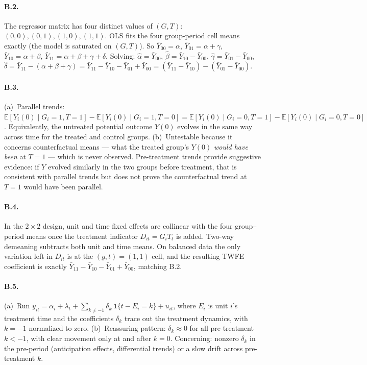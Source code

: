 \documentclass{article}
\newcommand{\E}{\mathbb{E}}
\begin{document}
\paragraph{B.2.}  The regressor matrix has four distinct values of $(G, T)$: $(0,0), (0,1), (1,0), (1,1)$.  OLS fits the four group-period cell means exactly (the model is saturated on $(G, T)$).  So $\bar Y_{00} = \alpha$, $\bar Y_{01} = \alpha + \gamma$, $\bar Y_{10} = \alpha + \beta$, $\bar Y_{11} = \alpha + \beta + \gamma + \delta$.  Solving: $\hat\alpha = \bar Y_{00}$, $\hat\beta = \bar Y_{10} - \bar Y_{00}$, $\hat\gamma = \bar Y_{01} - \bar Y_{00}$, $\hat\delta = \bar Y_{11} - (\alpha + \beta + \gamma) = \bar Y_{11} - \bar Y_{10} - \bar Y_{01} + \bar Y_{00} = (\bar Y_{11} - \bar Y_{10}) - (\bar Y_{01} - \bar Y_{00})$.

\paragraph{B.3.}  (a)~Parallel trends: $\E[Y_i(0) \mid G_i = 1, T = 1] - \E[Y_i(0) \mid G_i = 1, T = 0] = \E[Y_i(0) \mid G_i = 0, T = 1] - \E[Y_i(0) \mid G_i = 0, T = 0]$.  Equivalently, the untreated potential outcome $Y(0)$ evolves in the same way across time for the treated and control groups.  (b)~Untestable because it concerns counterfactual means --- what the treated group's $Y(0)$ \emph{would have been} at $T = 1$ --- which is never observed.  Pre-treatment trends provide suggestive evidence: if $Y$ evolved similarly in the two groups before treatment, that is consistent with parallel trends but does not prove the counterfactual trend at $T = 1$ would have been parallel.

\paragraph{B.4.}  In the $2 \times 2$ design, unit and time fixed effects are collinear with the four group--period means once the treatment indicator $D_{it} = G_i T_t$ is added.  Two-way demeaning subtracts both unit and time means.  On balanced data the only variation left in $D_{it}$ is at the $(g, t) = (1, 1)$ cell, and the resulting TWFE coefficient is exactly $\bar Y_{11} - \bar Y_{10} - \bar Y_{01} + \bar Y_{00}$, matching B.2.

\paragraph{B.5.}  (a)~Run $y_{it} = \alpha_i + \lambda_t + \sum_{k\neq -1}\delta_k\,\mathbf 1\{t - E_i = k\} + u_{it}$, where $E_i$ is unit $i$'s treatment time and the coefficients $\delta_k$ trace out the treatment dynamics, with $k = -1$ normalized to zero.  (b)~Reassuring pattern: $\delta_k \approx 0$ for all pre-treatment $k < -1$, with clear movement only at and after $k = 0$.  Concerning: nonzero $\delta_k$ in the pre-period (anticipation effects, differential trends) or a slow drift across pre-treatment $k$.
\end{document}
